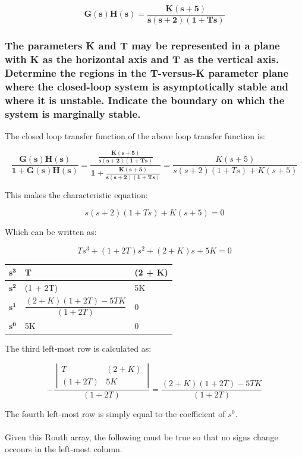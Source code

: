 \documentclass[12pt, letterpaper]{../assignment}
\begin{document}
$$ \mathbf{ G(s)H(s) = \frac{K(s+5)}{s (s+2) (1+ T s)} } $$

\subsubsection*{The parameters K and T may be represented in a plane with K as the horizontal axis and T as the vertical axis. Determine the regions in the T-versus-K parameter plane where the closed-loop system is asymptotically stable and where it is unstable. Indicate the boundary on which the system is marginally stable.}

The closed loop transfer function of the above loop transfer function is:

$$ \mathbf{ \frac{G(s)H(s)}{1 + G(s)H(s)} =
\frac{\frac{K(s+5)}{s (s+2) (1+ T s)}}{1+\frac{K(s+5)}{s (s+2) (1+ T s)}} = }
\frac{K(s+5)}{s (s+2) (1+ T s)+ K(s+5)} $$

This makes the characteristic equation:

$$ s (s+2) (1+ T s)+ K(s+5) = 0 $$

Which can be written as:

$$ Ts^3 + (1 + 2T) s^2  + (2 + K)s + 5K  = 0 $$


\begin{center}
    \begin{tabular}{ | m{2em} | m{15em}| m{15em} | } 
      \hline
      $\mathbf{s^3}$ & T & (2 + K) \\ 
      \hline
      $\mathbf{s^2}$ & (1 + 2T) & 5K \\ 
      \hline
      $\mathbf{s^1}$ & $\dfrac{(2 + K)(1 + 2T) -5TK}{(1 + 2T)}$ & 0 \\ 
      \hline
      $\mathbf{s^0}$ & 5K & 0 \\ 
      \hline
    \end{tabular}
\end{center}


The third left-most row is calculated as:

$$ - \frac{\ \left|\begin{array}{cc} T & (2 + K) \\ (1 + 2T) & 5K \end{array}\ \right|}{(1 + 2T)}
 = \dfrac{(2 + K)(1 + 2T) -5TK}{(1 + 2T)}$$

 The fourth left-most row is simply equal to the coefficient of $s^0$.
\\\\
 Given this Routh array, the following must be true so that no signs change occours in the left-most column.
\end{document}

